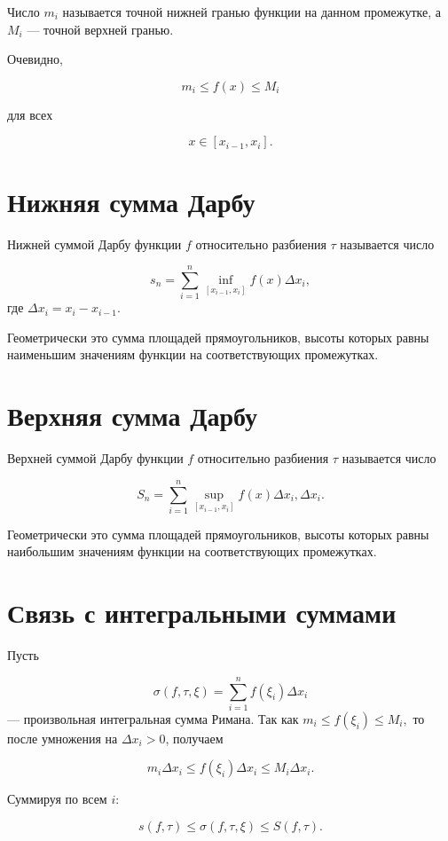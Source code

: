 \documentclass[14pt]{extreport}
\begin{document}
Число $m_i$ называется точной нижней гранью функции на данном промежутке, а $M_i$ — точной верхней гранью.

Очевидно,

\[
m_i\le f(x)\le M_i
\]

для всех

\[
x\in[x_{i-1},x_i].
\]

\section{Нижняя сумма Дарбу}

\begin{definition}
Нижней суммой Дарбу функции $f$ относительно разбиения $\tau$
называется число

\[
s_n
=
\sum_{i=1}^{n}
\inf_{[x_{i-1}, x_i]} f(x)\Delta x_i,
\]
где $\Delta x_i=x_i-x_{i-1}.$
\end{definition}

Геометрически это сумма площадей прямоугольников,
высоты которых равны наименьшим значениям функции на соответствующих промежутках.

\section{Верхняя сумма Дарбу}

\begin{definition}
Верхней суммой Дарбу функции $f$ относительно разбиения $\tau$
называется число

\[
S_n
=
\sum_{i=1}^{n}
\sup_{[x_{i-1}, x_i]} f(x)\Delta x_i,\Delta x_i.
\]
\end{definition}

Геометрически это сумма площадей прямоугольников,
высоты которых равны наибольшим значениям функции на соответствующих промежутках.

\section{Связь с интегральными суммами}

Пусть

\[
\sigma(f,\tau,\xi)
=
\sum_{i=1}^{n}
f(\xi_i)\Delta x_i
\]
— произвольная интегральная сумма Римана.
Так как $m_i\le f(\xi_i)\le M_i,$
то после умножения на $\Delta x_i>0$,
получаем

\[
m_i\Delta x_i
\le
f(\xi_i)\Delta x_i
\le
M_i\Delta x_i.
\]

Суммируя по всем $i$:

\[
\boxed{
s(f,\tau)
\le
\sigma(f,\tau,\xi)
\le
S(f,\tau).
}
\]
\end{document}
